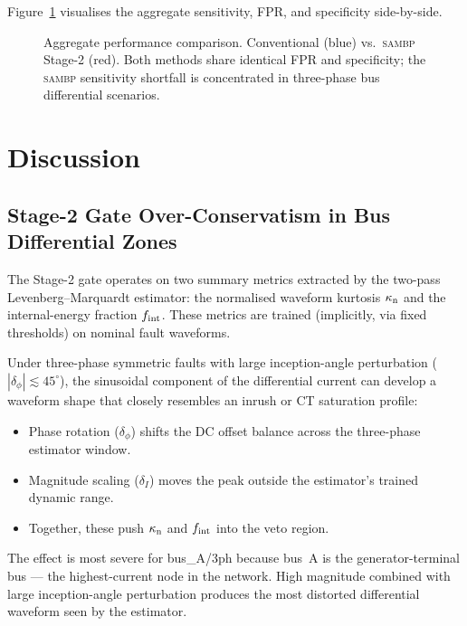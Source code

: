 \documentclass[12pt,a4paper]{article}
\newcommand{\SAMBP}{\textsc{sambp}}
\newcommand{\kappan}{\kappa_{\rm n}}
\newcommand{\fint}{f_{\rm int}}
\begin{document}
Figure~\ref{fig:mc_aggregate} visualises the aggregate sensitivity, FPR,
and specificity side-by-side.

\begin{figure}[ht]
  \centering
  
  \caption{Aggregate performance comparison.  Conventional (blue) vs.\
    \SAMBP{} Stage-2 (red).  Both methods share identical FPR and
    specificity; the \SAMBP{} sensitivity shortfall is
    concentrated in three-phase bus differential scenarios.}
  \label{fig:mc_aggregate}
\end{figure}


\section{Discussion}
\label{sec:discussion}

\subsection{Stage-2 Gate Over-Conservatism in Bus Differential Zones}
\label{sec:disc:veto}

The Stage-2 gate operates on two summary metrics extracted by the
two-pass Levenberg--Marquardt estimator: the normalised waveform kurtosis
$\kappan$ and the internal-energy fraction $\fint$.  These metrics are
trained (implicitly, via fixed thresholds) on nominal fault waveforms.

Under three-phase symmetric faults with large inception-angle
perturbation ($|\delta_\phi| \lesssim 45^\circ$), the sinusoidal
component of the differential current can develop a waveform shape that
closely resembles an inrush or CT saturation profile:
\begin{itemize}[noitemsep]
  \item Phase rotation ($\delta_\phi$) shifts the DC offset balance
    across the three-phase estimator window.
  \item Magnitude scaling ($\delta_I$) moves the peak outside the
    estimator's trained dynamic range.
  \item Together, these push $\kappan$ and $\fint$ into the veto region.
\end{itemize}

The effect is most severe for bus\_A/3ph because bus~A is the
generator-terminal bus — the highest-current node in the network.  High
magnitude combined with large inception-angle perturbation produces the
most distorted differential waveform seen by the estimator.
\end{document}
